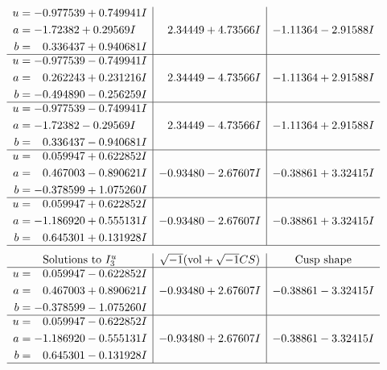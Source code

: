 \documentclass[1p]{elsarticle_modified}
\theoremstyle{definition}
\newcommand{\I}{\sqrt{-1}}
\begin{document}
$$\begin{array}{c|c|c}
\begin{aligned}
u &= -0.977539 + 0.749941 I \\
a &= -1.72382 + 0.29569 I \\
b &= \phantom{-}0.336437 + 0.940681 I\end{aligned}
 & \phantom{-}2.34449 + 4.73566 I & -1.11364 - 2.91588 I \\ \hline\begin{aligned}
u &= -0.977539 - 0.749941 I \\
a &= \phantom{-}0.262243 + 0.231216 I \\
b &= -0.494890 - 0.256259 I\end{aligned}
 & \phantom{-}2.34449 - 4.73566 I & -1.11364 + 2.91588 I \\ \hline\begin{aligned}
u &= -0.977539 - 0.749941 I \\
a &= -1.72382 - 0.29569 I \\
b &= \phantom{-}0.336437 - 0.940681 I\end{aligned}
 & \phantom{-}2.34449 - 4.73566 I & -1.11364 + 2.91588 I \\ \hline\begin{aligned}
u &= \phantom{-}0.059947 + 0.622852 I \\
a &= \phantom{-}0.467003 - 0.890621 I \\
b &= -0.378599 + 1.075260 I\end{aligned}
 & -0.93480 - 2.67607 I & -0.38861 + 3.32415 I \\ \hline\begin{aligned}
u &= \phantom{-}0.059947 + 0.622852 I \\
a &= -1.186920 + 0.555131 I \\
b &= \phantom{-}0.645301 + 0.131928 I\end{aligned}
 & -0.93480 - 2.67607 I & -0.38861 + 3.32415 I\\
 \hline 
 \end{array}$$\newpage$$\begin{array}{c|c|c}  
\text{Solutions to }I^u_{3}& \I (\text{vol} + \sqrt{-1}CS) & \text{Cusp shape}\\
 \hline 
\begin{aligned}
u &= \phantom{-}0.059947 - 0.622852 I \\
a &= \phantom{-}0.467003 + 0.890621 I \\
b &= -0.378599 - 1.075260 I\end{aligned}
 & -0.93480 + 2.67607 I & -0.38861 - 3.32415 I \\ \hline\begin{aligned}
u &= \phantom{-}0.059947 - 0.622852 I \\
a &= -1.186920 - 0.555131 I \\
b &= \phantom{-}0.645301 - 0.131928 I\end{aligned}
 & -0.93480 + 2.67607 I & -0.38861 - 3.32415 I\\
 \hline 
 \end{array}$$\newpage\newpage\renewcommand{\arraystretch}{1}
\end{document}
